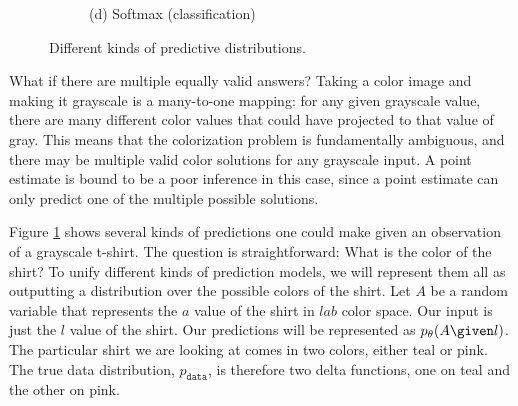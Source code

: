 \begin{figure}
{\begin{minipage}{0.84\linewidth}
\begin{subfigure}[b]{0.5\textwidth}
                \caption*{(d) Softmax (classification)}
            \end{subfigure}
            \hfill
        \end{minipage}
    }
    \caption{Different kinds of predictive distributions.}
    \label{fig:conditional_generative_models:tshirts}
\end{figure}

What if there are multiple equally valid answers? Taking a color image and making it grayscale is a many-to-one mapping: for any given grayscale value, there are many different color values that could have projected to that value of gray. This means that the colorization problem is fundamentally ambiguous, and there may be multiple valid color solutions for any grayscale input. A point estimate is bound to be a poor inference in this case, since a point estimate can only predict one of the multiple possible solutions.



Figure \ref{fig:conditional_generative_models:tshirts} shows several kinds of predictions one could make given an observation of a grayscale t-shirt. The question is straightforward: What is the color of the shirt? To unify different kinds of prediction models, we will represent them all as outputting a distribution over the possible colors of the shirt. Let $A$ be a random variable that represents the $a$ value of the shirt in $lab$ color space. Our input is just the $l$ value of the shirt. Our predictions will be represented as $p_{\theta}(A \given l)$. The particular shirt we are looking at comes in two colors, either teal or pink. The true data distribution, $p_{\texttt{data}}$, is therefore two delta functions, one on teal and the other on pink.

